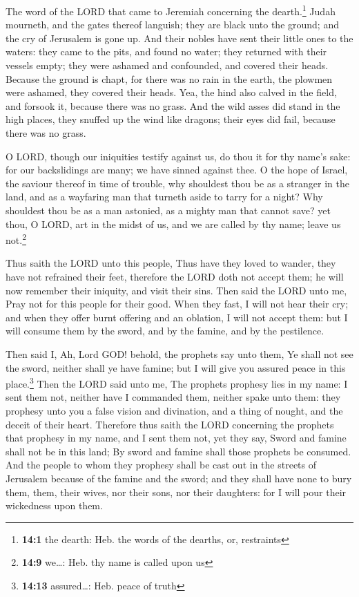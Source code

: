  The word of the LORD that came to Jeremiah concerning the
dearth.\footnote{\textbf{14:1} the dearth: Heb. the words of the
  dearths, or, restraints}  Judah mourneth, and the gates
thereof languish; they are black unto the ground; and the cry of
Jerusalem is gone up.  And their nobles have sent their
little ones to the waters: they came to the pits, and found no water;
they returned with their vessels empty; they were ashamed and
confounded, and covered their heads.  Because the ground
is chapt, for there was no rain in the earth, the plowmen were ashamed,
they covered their heads.  Yea, the hind also calved in
the field, and forsook it, because there was no grass. 
And the wild asses did stand in the high places, they snuffed up the
wind like dragons; their eyes did fail, because there was no grass.

 O LORD, though our iniquities testify against us, do thou
it for thy name's sake: for our backslidings are many; we have sinned
against thee.  O the hope of Israel, the saviour thereof
in time of trouble, why shouldest thou be as a stranger in the land, and
as a wayfaring man that turneth aside to tarry for a night?
 Why shouldest thou be as a man astonied, as a mighty man
that cannot save? yet thou, O LORD, art in the midst of us, and we are
called by thy name; leave us not.\footnote{\textbf{14:9} we\ldots: Heb.
  thy name is called upon us}

 Thus saith the LORD unto this people, Thus have they
loved to wander, they have not refrained their feet, therefore the LORD
doth not accept them; he will now remember their iniquity, and visit
their sins.  Then said the LORD unto me, Pray not for
this people for their good.  When they fast, I will not
hear their cry; and when they offer burnt offering and an oblation, I
will not accept them: but I will consume them by the sword, and by the
famine, and by the pestilence.

 Then said I, Ah, Lord GOD! behold, the prophets say unto
them, Ye shall not see the sword, neither shall ye have famine; but I
will give you assured peace in this place.\footnote{\textbf{14:13}
  assured\ldots: Heb. peace of truth}  Then the LORD said
unto me, The prophets prophesy lies in my name: I sent them not, neither
have I commanded them, neither spake unto them: they prophesy unto you a
false vision and divination, and a thing of nought, and the deceit of
their heart.  Therefore thus saith the LORD concerning
the prophets that prophesy in my name, and I sent them not, yet they
say, Sword and famine shall not be in this land; By sword and famine
shall those prophets be consumed.  And the people to whom
they prophesy shall be cast out in the streets of Jerusalem because of
the famine and the sword; and they shall have none to bury them, them,
their wives, nor their sons, nor their daughters: for I will pour their
wickedness upon them.

